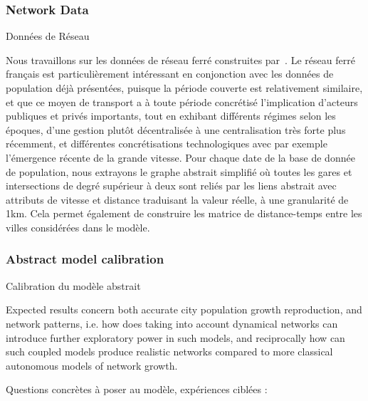 \subsubsection{Network Data}{Données de Réseau}

Nous travaillons sur les données de réseau ferré construites par~\cite{thevenin2013mapping}. Le réseau ferré français est particulièrement intéressant en conjonction avec les données de population déjà présentées, puisque la période couverte est relativement similaire, et que ce moyen de transport a à toute période concrétisé l'implication d'acteurs publiques et privés importants, tout en exhibant différents régimes selon les époques, d'une gestion plutôt décentralisée à une centralisation très forte plus récemment, et différentes concrétisations technologiques avec par exemple l'émergence récente de la grande vitesse. Pour chaque date de la base de donnée de population, nous extrayons le graphe abstrait simplifié où toutes les gares et intersections de degré supérieur à deux sont reliés par les liens abstrait avec attributs de vitesse et distance traduisant la valeur réelle, à une granularité de 1km. Cela permet également de construire les matrice de distance-temps entre les villes considérées dans le modèle.














\subsubsection{Abstract model calibration}{Calibration du modèle abstrait}




Expected results concern both accurate city population growth reproduction, and network patterns, i.e. how does taking into account dynamical networks can introduce further exploratory power in such models, and reciprocally how can such coupled models produce realistic networks compared to more classical autonomous models of network growth.

Questions concrètes à poser au modèle, expériences ciblées : 

